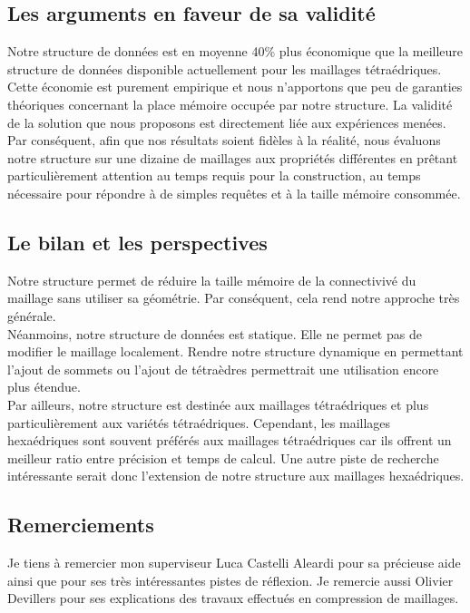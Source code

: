 \subsection*{Les arguments en faveur de sa validité}
\noindent
Notre structure de données est en moyenne 40\% plus économique que la meilleure structure de données disponible actuellement pour les maillages tétraédriques. Cette économie est purement empirique et nous n'apportons que peu de garanties théoriques concernant la place mémoire occupée par notre structure. La validité de la solution que nous proposons est directement liée aux expériences menées. Par conséquent, afin que nos résultats soient fidèles à la réalité, nous évaluons notre structure sur une dizaine de maillages aux propriétés différentes en prêtant particulièrement attention au temps requis pour la construction, au temps nécessaire pour répondre à de simples requêtes et à la taille mémoire consommée.

\subsection*{Le bilan et les perspectives}
\noindent
Notre structure permet de réduire la taille mémoire de la connectivivé du maillage sans utiliser sa géométrie. Par conséquent, cela rend notre approche très générale.\\
Néanmoins, notre structure de données est statique. Elle ne permet pas de modifier le maillage localement. Rendre notre structure dynamique en permettant l'ajout de sommets ou l'ajout de tétraèdres permettrait une utilisation encore plus étendue.\\
Par ailleurs, notre structure est destinée aux maillages tétraédriques et plus particulièrement aux variétés tétraédriques. Cependant, les maillages hexaédriques sont souvent préférés aux maillages tétraédriques car ils offrent un meilleur ratio entre précision et temps de calcul. Une autre piste de recherche intéressante serait donc l'extension de notre structure aux maillages hexaédriques.

\subsection*{Remerciements}
\noindent
Je tiens à remercier mon superviseur Luca Castelli Aleardi pour sa précieuse aide ainsi que pour ses très intéressantes pistes de réflexion. Je remercie aussi Olivier Devillers pour ses explications des travaux effectués en compression de maillages.

